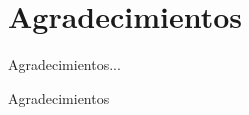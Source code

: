 
\begingroup
\chapter*{Agradecimientos}

Agradecimientos...

\vfill

\noindent
Agradecimientos

\endgroup
